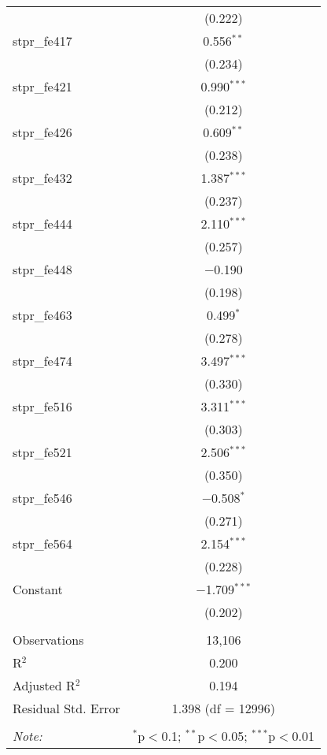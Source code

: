 \begin{table}[!htbp]
\begin{tabular}{@{\extracolsep{5pt}}lc}
  & (0.222) \\ 
  stpr\_fe417 & 0.556$^{**}$ \\ 
  & (0.234) \\ 
  stpr\_fe421 & 0.990$^{***}$ \\ 
  & (0.212) \\ 
  stpr\_fe426 & 0.609$^{**}$ \\ 
  & (0.238) \\ 
  stpr\_fe432 & 1.387$^{***}$ \\ 
  & (0.237) \\ 
  stpr\_fe444 & 2.110$^{***}$ \\ 
  & (0.257) \\ 
  stpr\_fe448 & $-$0.190 \\ 
  & (0.198) \\ 
  stpr\_fe463 & 0.499$^{*}$ \\ 
  & (0.278) \\ 
  stpr\_fe474 & 3.497$^{***}$ \\ 
  & (0.330) \\ 
  stpr\_fe516 & 3.311$^{***}$ \\ 
  & (0.303) \\ 
  stpr\_fe521 & 2.506$^{***}$ \\ 
  & (0.350) \\ 
  stpr\_fe546 & $-$0.508$^{*}$ \\ 
  & (0.271) \\ 
  stpr\_fe564 & 2.154$^{***}$ \\ 
  & (0.228) \\ 
  Constant & $-$1.709$^{***}$ \\ 
  & (0.202) \\ 
 \hline \\[-1.8ex] 
Observations & 13,106 \\ 
R$^{2}$ & 0.200 \\ 
Adjusted R$^{2}$ & 0.194 \\ 
Residual Std. Error & 1.398 (df = 12996) \\ 
\hline 
\hline \\[-1.8ex] 
\textit{Note:}  & \multicolumn{1}{r}{$^{*}$p$<$0.1; $^{**}$p$<$0.05; $^{***}$p$<$0.01} \\ 
\end{tabular} 
\end{table} 
